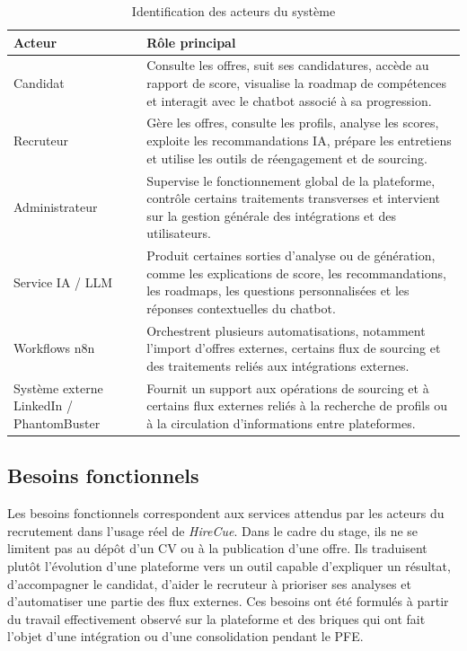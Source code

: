 \begin{table}[H]
\centering
\renewcommand{\arraystretch}{1.3}
\begin{tabular}{|p{4cm}|p{10cm}|}
\hline
\rowcolor{TableHeaderBlue}
\textbf{Acteur} & \textbf{Rôle principal} \\
\hline
Candidat & Consulte les offres, suit ses candidatures, accède au rapport de score, visualise la roadmap de compétences et interagit avec le chatbot associé à sa progression. \\
\hline
Recruteur & Gère les offres, consulte les profils, analyse les scores, exploite les recommandations IA, prépare les entretiens et utilise les outils de réengagement et de sourcing. \\
\hline
Administrateur & Supervise le fonctionnement global de la plateforme, contrôle certains traitements transverses et intervient sur la gestion générale des intégrations et des utilisateurs. \\
\hline
Service IA / LLM & Produit certaines sorties d'analyse ou de génération, comme les explications de score, les recommandations, les roadmaps, les questions personnalisées et les réponses contextuelles du chatbot. \\
\hline
Workflows n8n & Orchestrent plusieurs automatisations, notamment l'import d'offres externes, certains flux de sourcing et des traitements reliés aux intégrations externes. \\
\hline
Système externe LinkedIn / PhantomBuster & Fournit un support aux opérations de sourcing et à certains flux externes reliés à la recherche de profils ou à la circulation d'informations entre plateformes. \\
\hline
\end{tabular}
\caption{Identification des acteurs du système}
\end{table}

\subsection{Besoins fonctionnels}

Les besoins fonctionnels correspondent aux services attendus par les acteurs du recrutement dans l'usage réel de \textit{HireCue}. Dans le cadre du stage, ils ne se limitent pas au dépôt d'un CV ou à la publication d'une offre. Ils traduisent plutôt l'évolution d'une plateforme vers un outil capable d'expliquer un résultat, d'accompagner le candidat, d'aider le recruteur à prioriser ses analyses et d'automatiser une partie des flux externes. Ces besoins ont été formulés à partir du travail effectivement observé sur la plateforme et des briques qui ont fait l'objet d'une intégration ou d'une consolidation pendant le PFE.

